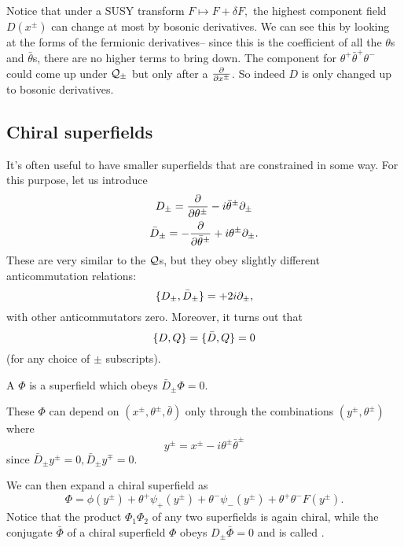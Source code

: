 Notice that under a SUSY transform $F\mapsto F+\delta F,$ the highest component field $D(x^\pm)$ can change at most by bosonic derivatives. We can see this by looking at the forms of the fermionic derivatives-- since this is the coefficient of all the $\theta$s and $\bar \theta$s, there are no higher terms to bring down. The component for $\theta^+\bar \theta^+ \theta^-$ could come up under $\cQ_\pm$ but only after a $\P{}{x^\pm}$. So indeed $D$ is only changed up to bosonic derivatives.

\subsection*{Chiral superfields} It's often useful to have smaller superfields that are constrained in some way. For this purpose, let us introduce
\begin{gather}
    D_\pm = \P{}{\theta^\pm} - i \bar \theta^\pm \p_\pm\\
    \bar D_\pm = -\P{}{\bar \theta^\pm} +i\theta^\pm \p_\pm.
\end{gather}
These are very similar to the $\cQ$s, but they obey slightly different anticommutation relations:
\begin{equation}
    \set{D_\pm,\bar D_\pm}=+2i\p_\pm,
\end{equation}
with other anticommutators zero. Moreover, it turns out that
\begin{equation}
    \set{D,Q}=\set{\bar D,Q}=0
\end{equation}
(for any choice of $\pm$ subscripts).

\begin{defn}
    A  $\Phi$ is a superfield which obeys $\bar D_\pm \Phi=0$.
\end{defn}
These $\Phi$ can depend on $(x^\pm,\theta^\pm,\bar \theta)$ only through the combinations $(y^\pm,\theta^\pm)$ where 
\begin{equation}
    y^\pm = x^\pm - i \theta^\pm \bar \theta^\pm
\end{equation}
since $\bar D_\pm y^\pm = 0, \bar D_\pm y^\mp = 0$.

We can then expand a chiral superfield as
\begin{equation}
    \Phi=\phi(y^\pm)+\theta^+ \psi_+ (y^\pm) +\theta^- \psi_- (y^\pm) + \theta^+\theta^- F(y^\pm).
\end{equation}
Notice that the product $\Phi_1\Phi_2$ of any two superfields is again chiral, while the conjugate $\bar \Phi$ of a chiral superfield $\Phi$ obeys $D_\pm \bar \Phi=0$ and is called .

